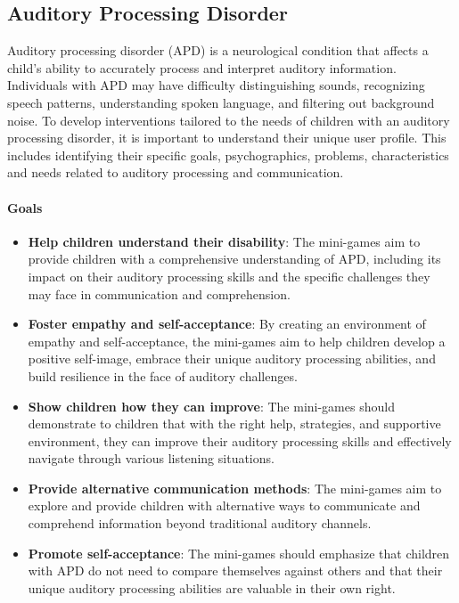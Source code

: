 \subsection{Auditory Processing Disorder}
Auditory processing disorder (APD) is a neurological condition that affects a child's ability to accurately process and interpret auditory information. Individuals with APD may have difficulty distinguishing sounds, recognizing speech patterns, understanding spoken language, and filtering out background noise. To develop interventions tailored to the needs of children with an auditory processing disorder, it is important to understand their unique user profile. This includes identifying their specific goals, psychographics, problems, characteristics and needs related to auditory processing and communication.

\paragraph{Goals}
\begin{itemize}
    \item \textbf{Help children understand their disability}: The mini-games aim to provide children with a comprehensive understanding of APD, including its impact on their auditory processing skills and the specific challenges they may face in communication and comprehension.
    \item \textbf{Foster empathy and self-acceptance}: By creating an environment of empathy and self-acceptance, the mini-games aim to help children develop a positive self-image, embrace their unique auditory processing abilities, and build resilience in the face of auditory challenges.
    \item \textbf{Show children how they can improve}: The mini-games should demonstrate to children that with the right help, strategies, and supportive environment, they can improve their auditory processing skills and effectively navigate through various listening situations.
    \item \textbf{Provide alternative communication methods}: The mini-games aim to explore and provide children with alternative ways to communicate and comprehend information beyond traditional auditory channels.
    \item \textbf{Promote self-acceptance}: The mini-games should emphasize that children with APD do not need to compare themselves against others and that their unique auditory processing abilities are valuable in their own right.
\end{itemize}

